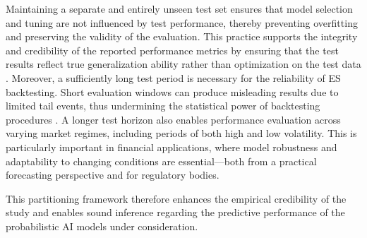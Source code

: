 Maintaining a separate and entirely unseen test set ensures that model selection and tuning are not influenced by test performance, thereby preventing overfitting and preserving the validity of the evaluation. This practice supports the integrity and credibility of the reported performance metrics by ensuring that the test results reflect true generalization ability rather than optimization on the test data \parencite{hyndman2018forecasting}. Moreover, a sufficiently long test period is necessary for the reliability of ES backtesting. Short evaluation windows can produce misleading results due to limited tail events, thus undermining the statistical power of backtesting procedures \parencite{Bayer2020}. A longer test horizon also enables performance evaluation across varying market regimes, including periods of both high and low volatility. This is particularly important in financial applications, where model robustness and adaptability to changing conditions are essential—both from a practical forecasting perspective and for regulatory bodies.

This partitioning framework therefore enhances the empirical credibility of the study and enables sound inference regarding the predictive performance of the probabilistic AI models under consideration.

